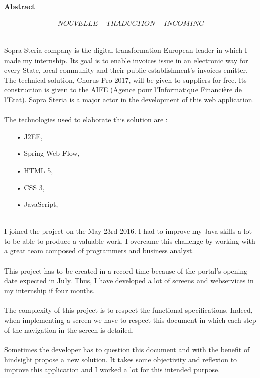 \documentclass[12pt,a4paper]{article}
\begin{document}
\paragraph{Abstract}
\[NOUVELLE-TRADUCTION-INCOMING\]
~~\\\\
Sopra Steria company is the digital transformation European leader in which I made my internship. Its goal is to enable invoices issue in an electronic way for every State, local community and their public establishment's invoices emitter.\\
The technical solution, Chorus Pro 2017, will be given to suppliers for free. Its construction is given to the AIFE (Agence pour l'Informatique Financière de l'Etat). Sopra Steria is a major actor in the development of this web application.\\\\
The technologies used to elaborate this solution are :
\begin{itemize}
\item[•] \gls{J2EE},
\item[•] Spring Web Flow,
\item[•] HTML 5,
\item[•] CSS 3,
\item[•] JavaScript,
\end{itemize}
~~\\
I joined the project on the May 23rd 2016. I had to improve my Java skills a lot to be able to produce a valuable work. I overcame this challenge by working with a great team composed of programmers and business analyst.\\\\
This project has to be created in a record time because of the portal's opening date expected in July. Thus, I have developed a lot of screens and webservices in my internship if four months.\\\\
The complexity of this project is to respect the functional specifications. Indeed, when implementing a screen we have to respect this document in which each step of the navigation in the screen is detailed.\\\\
Sometimes the developer has to question this document and with the benefit of hindsight propose a new solution. It takes some objectivity and reflexion to improve this application and I worked a lot for this intended purpose.
\newpage
\renewcommand{\contentsname}{Table des matières}
\tableofcontents
\newpage
\end{document}
